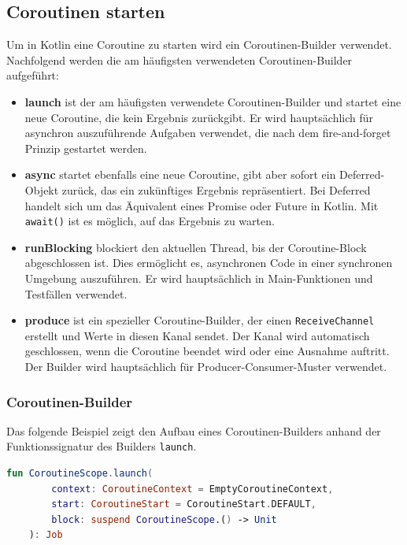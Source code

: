 \documentclass[fontsize=12pt,paper=a4,twoside=semi,parskip=half-,headsepline,headinclude]{scrreprt}
\begin{document}
\subsection{Coroutinen starten}
\label{subsec:corostarten}

Um in Kotlin eine Coroutine zu starten wird ein Coroutinen-Builder verwendet. Nachfolgend werden  die am häufigsten verwendeten Coroutinen-Builder aufgeführt:

\begin{itemize}
	\item \textbf{launch} ist der am häufigsten verwendete Coroutinen-Builder und startet eine neue Coroutine, die kein Ergebnis zurückgibt. Er wird hauptsächlich für asynchron auszuführende Aufgaben verwendet, die nach dem fire-and-forget Prinzip gestartet werden.
	\item \textbf{async} startet ebenfalls eine neue Coroutine, gibt aber sofort ein Deferred-Objekt zurück, das ein zukünftiges Ergebnis repräsentiert. Bei Deferred handelt sich um das Äquivalent eines Promise oder Future in Kotlin. Mit \texttt{await()} ist es möglich, auf das Ergebnis zu warten.
	\item \textbf{runBlocking} blockiert den aktuellen Thread, bis der Coroutine-Block abgeschlossen ist. Dies ermöglicht es, asynchronen Code in einer synchronen Umgebung auszuführen. Er wird hauptsächlich in Main-Funktionen und Testfällen verwendet.
	\item \textbf{produce} ist ein spezieller Coroutine-Builder, der einen \texttt{ReceiveChannel} erstellt und Werte in diesen Kanal sendet. Der Kanal wird automatisch geschlossen, wenn die Coroutine beendet wird oder eine Ausnahme auftritt. Der Builder wird hauptsächlich für Producer-Consumer-Muster verwendet.
\end{itemize}


\subsubsection{Coroutinen-Builder}

Das folgende Beispiel zeigt den Aufbau eines Coroutinen-Builders anhand der Funktionssignatur des Builders \texttt{launch}.

\begin{lstlisting}[language=Kotlin]
	fun CoroutineScope.launch(
		context: CoroutineContext = EmptyCoroutineContext,
		start: CoroutineStart = CoroutineStart.DEFAULT,
		block: suspend CoroutineScope.() -> Unit
	): Job
\end{lstlisting}
\end{document}
